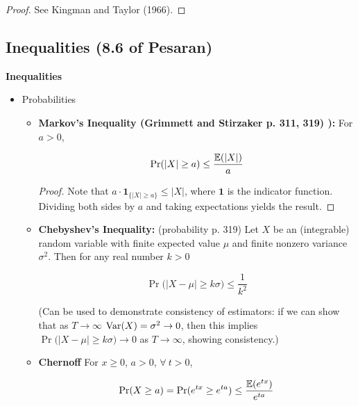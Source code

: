 \begin{proof} See Kingman and Taylor (1966). \end{proof}


\subsection{Inequalities (8.6 of Pesaran)}
\label{sec:tsch8.6}

\textbf{Inequalities}

\begin{itemize}

\item Probabilities

\begin{itemize}

\item \begin{lemma}\label{asym.markov} \textbf{Markov's Inequality (Grimmett and Stirzaker p. 311, 319) ):} For \(a > 0\),

\[
\Pr(|X| \geq a) \leq \frac{\mathbb{E}(|X|)}{a}
\]
\end{lemma}
\begin{proof} Note that \( a \cdot \boldsymbol{1}_{\{|X| \geq a\}} \leq |X|\), where \(\boldsymbol{1}\) is the indicator function. Dividing both sides by \(a\) and taking expectations yields the result. \end{proof}

\item \begin{theorem}\label{asym.cheby}\textbf{Chebyshev's Inequality:} (probability p. 319) Let \(X\) be an (integrable) random variable with finite expected value \(\mu\) and finite nonzero variance \(\sigma^2\). Then for any real number \(k > 0\)

\[
\Pr \big(\left| X - \mu \right| \geq k \sigma \big) \leq \frac{1}{k^2}
\] 
\end{theorem}

(Can be used to demonstrate consistency of estimators: if we can show that as \(T \to \infty\) \(\mathrm{Var}(X) = \sigma^2 \to 0\), then this implies \(\Pr \big(\left| X - \mu \right| \geq k \sigma \big) \to 0\) as \(T \to \infty\), showing consistency.)

\item \begin{theorem} \textbf{Chernoff} For \(x \geq 0\), \(a > 0\), \(\forall \ t > 0\),

\[
\Pr(X \geq a) = \Pr( e^{tx} \geq e^{ta} ) \leq \frac{\mathbb{E}(e^{tx})}{e^{ta}}
\]
\end{theorem} 
\end{itemize}


\end{itemize}
